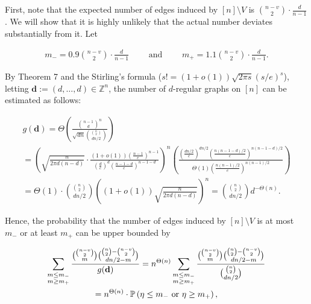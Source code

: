 First, note that the expected number of edges induced by $[n]\setminus V$ is $\binom{n-v}{2}\cdot\frac{d}{n-1}$. We will show that it is highly unlikely that the actual number deviates substantially from it. Let\par


\[\begin{gathered}
m_{-}=0.9\binom{n-v}{2}\cdot\frac{d}{n-1}\qquad\text{ and }\qquad m_{+}=1.1\binom{n-v}{2}\cdot\frac{d}{n-1}.
\end{gathered}\]


By Theorem 7 and the Stirling’s formula ($s!=(1+o(1))\sqrt{2\pi s}(s/e)^{s}$), letting $\mathbf{d}:=(d,\ldots,d)\in\mathbb{Z}^{n}$, the number of $d$-regular graphs on $[n]$ can be estimated as follows:\par


\[\begin{gathered}
\displaystyle g(\mathbf{d}) \displaystyle=\Theta\left(\frac{{n-1\choose d}^{n}}{\sqrt{dn}{{\binom{n}{2}}\choose dn/2}}\right) \\
\displaystyle=\left(\!\sqrt{\frac{n}{2\pi d(n-d)}}\cdot\frac{(1+o(1))\left(\frac{n-1}{e}\right)^{n-1}}{\left(\frac{d}{e}\right)^{d}\left(\frac{n-1-d}{e}\right)^{n-1-d}}\right)^{n}\!\left(\!\frac{\left(\frac{dn/2}{e}\right)^{dn/2}\left(\frac{n(n-1-d)/2}{e}\right)^{n(n-1-d)/2}}{\Theta(1)\left(\frac{n(n-1)/2}{e}\right)^{n(n-1)/2}}\right) \\
\displaystyle=\Theta(1)\cdot{{\binom{n}{2}}\choose dn/2}\left(\!(1+o(1))\sqrt{\frac{n}{2\pi d(n-d)}}\right)^{n}={{\binom{n}{2}}\choose dn/2}d^{-\Theta(n)}.
\end{gathered}\]


Hence, the probability that the number of edges induced by $[n]\setminus V$ is at most $m_{-}$ or at least $m_{+}$ can be upper bounded by\par


\[\begin{gathered}
\displaystyle\sum_{\begin{subarray}{c}m\leq m_{-}\\
m\geq m_{+}\end{subarray}}\frac{{{n-v\choose 2}\choose m}{{\binom{n}{2}}-{n-v\choose 2}\choose dn/2-m}}{g(\mathbf{d})} \displaystyle=n^{\Theta(n)}\sum_{\begin{subarray}{c}m\leq m_{-}\\
m\geq m_{+}\end{subarray}}\frac{{{n-v\choose 2}\choose m}{{\binom{n}{2}}-{n-v\choose 2}\choose dn/2-m}}{{{\binom{n}{2}}\choose dn/2}} \\
\displaystyle=n^{\Theta(n)}\cdot\mathbb{P}\left(\eta\leq m_{-}\text{ or }\eta\geq m_{+}\right),
\end{gathered}\]


